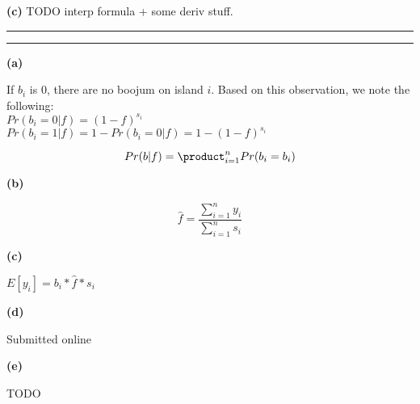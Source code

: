 \documentclass[11pt,letterpaper]{article}
\newcommand{\question}[1] {\vspace{.25in} \hrule\vspace{0.5em}
\noindent{\bf #1} \vspace{0.5em}
\hrule \vspace{.10in}}
\renewcommand{\part}[1] {\vspace{.10in} {\bf (#1)}}
\begin{document}
\part{c}
TODO interp formula + some deriv stuff.

\question{4}
\part{a}

If $b_i$ is 0, there are no boojum on island $i$. Based on this observation, we note the following:\\
$Pr(b_i = 0| f) = (1-f)^{s_i}$\\
$Pr(b_i = 1| f) = 1 - Pr(b_i = 0 | f) = 1 - (1-f)^{s_i}$

$$Pr(b | f) = \product_{i=1}^n Pr(b_i = b_i)$$

\part{b}

$$\hat{f} = \frac{\sum_{i=1}^n y_i}{\sum_{i=1}^n s_i} $$

\part{c}

$E[y_i] = b_i * \hat{f} * s_i$

\part{d}

Submitted online

\part{e}

TODO
\end{document}
